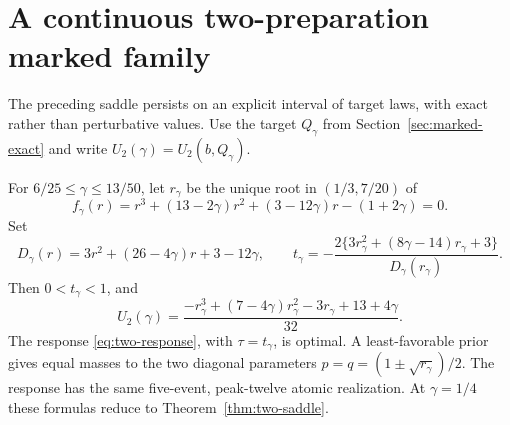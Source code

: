 \section{A continuous two-preparation marked family}
\label{sec:two-family}
The preceding saddle persists on an explicit interval of target laws,
with exact rather than perturbative values. Use the target $Q_\gamma$
from Section~\ref{sec:marked-exact} and write $U_2(\gamma)=U_2(b,Q_\gamma)$.

\begin{theorem}\label{thm:two-family}
For $6/25\le\gamma\le13/50$, let $r_\gamma$ be the unique root in
$(1/3,7/20)$ of
\begin{equation}\label{eq:family-cubic}
 f_\gamma(r)=r^3+(13-2\gamma)r^2+(3-12\gamma)r-(1+2\gamma)=0.
\end{equation}
Set
\[
 D_\gamma(r)=3r^2+(26-4\gamma)r+3-12\gamma,\qquad
 t_\gamma=-\frac{2\{3r_\gamma^2+(8\gamma-14)r_\gamma+3\}}
                         {D_\gamma(r_\gamma)}.
\]
Then $0<t_\gamma<1$, and
\begin{equation}\label{eq:two-family-value}
 U_2(\gamma)=
 \frac{-r_\gamma^3+(7-4\gamma)r_\gamma^2-3r_\gamma+13+4\gamma}{32}.
\end{equation}
The response \eqref{eq:two-response}, with $\tau=t_\gamma$, is optimal.
A least-favorable prior gives equal masses to the two diagonal parameters
$p=q=(1\pm\sqrt{r_\gamma})/2$. The response has the same five-event,
peak-twelve atomic realization. At $\gamma=1/4$ these formulas reduce to
Theorem~\ref{thm:two-saddle}.
\end{theorem}
